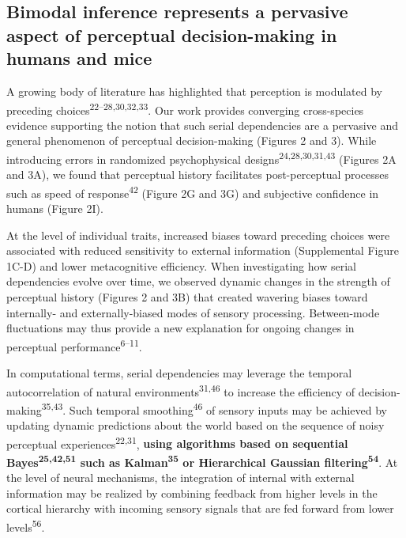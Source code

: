 \documentclass[
]{article}
\begin{document}
\hypertarget{bimodal-inference-represents-a-pervasive-aspect-of-perceptual-decision-making-in-humans-and-mice}{%
\subsection{Bimodal inference represents a pervasive aspect of
perceptual decision-making in humans and
mice}\label{bimodal-inference-represents-a-pervasive-aspect-of-perceptual-decision-making-in-humans-and-mice}}

A growing body of literature has highlighted that perception is
modulated by preceding choices\textsuperscript{22--28,30,32,33}. Our
work provides converging cross-species evidence supporting the notion
that such serial dependencies are a pervasive and general phenomenon of
perceptual decision-making (Figures 2 and 3). While introducing errors
in randomized psychophysical designs\textsuperscript{24,28,30,31,43}
(Figures 2A and 3A), we found that perceptual history facilitates
post-perceptual processes such as speed of response\textsuperscript{42}
(Figure 2G and 3G) and subjective confidence in humans (Figure 2I).

At the level of individual traits, increased biases toward preceding
choices were associated with reduced sensitivity to external information
(Supplemental Figure 1C-D) and lower metacognitive efficiency. When
investigating how serial dependencies evolve over time, we observed
dynamic changes in the strength of perceptual history (Figures 2 and 3B)
that created wavering biases toward internally- and externally-biased
modes of sensory processing. Between-mode fluctuations may thus provide
a new explanation for ongoing changes in perceptual
performance\textsuperscript{6--11}.

In computational terms, serial dependencies may leverage the temporal
autocorrelation of natural environments\textsuperscript{31,46} to
increase the efficiency of decision-making\textsuperscript{35,43}. Such
temporal smoothing\textsuperscript{46} of sensory inputs may be achieved
by updating dynamic predictions about the world based on the sequence of
noisy perceptual experiences\textsuperscript{22,31}, \textbf{using
algorithms based on sequential Bayes\textsuperscript{25,42,51} such as
Kalman\textsuperscript{35} or Hierarchical Gaussian
filtering\textsuperscript{54}}. At the level of neural mechanisms, the
integration of internal with external information may be realized by
combining feedback from higher levels in the cortical hierarchy with
incoming sensory signals that are fed forward from lower
levels\textsuperscript{56}.
\end{document}
